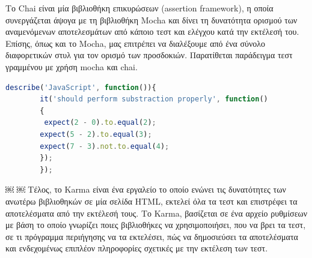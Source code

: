 		Το Chai είναι μία βιβλιοθήκη επικυρώσεων (assertion framework), η οποία συνεργάζεται άψογα με τη βιβλιοθήκη Mocha και δίνει τη δυνατότητα ορισμού των αναμενόμενων αποτελεσμάτων από κάποιο τεστ και ελέγχου κατά την εκτέλεσή του. Επίσης, όπως και το Mocha, μας επιτρέπει να διαλέξουμε από ένα σύνολο διαφορετικών στυλ για τον ορισμό των προσδοκιών. Παρατίθεται παράδειγμα τεστ γραμμένου με χρήση mocha και chai.
		
		   	\begin{lstlisting}[language=JavaScript]		
		describe('JavaScript', function()){
		it('should perform substraction properly', function() 
		{
	     expect(2 - 0).to.equal(2);
		expect(5 - 2).to.equal(3); 
		expect(7 - 3).not.to.equal(4);
		}); 
		});
				\end{lstlisting}
				
￼
￼
		Τέλος, το Karma είναι ένα εργαλείο το οποίο ενώνει τις δυνατότητες των ανωτέρω βιβλιοθηκών σε μία σελίδα HTML, εκτελεί όλα τα τεστ και επιστρέφει τα αποτελέσματα από την εκτέλεσή τους. Το Karma, βασίζεται σε ένα αρχείο ρυθμίσεων με βάση το οποίο γνωρίζει ποιες βιβλιοθήκες να χρησιμοποιήσει, που να βρει τα τεστ, σε τι πρόγραμμα περιήγησης να τα εκτελέσει, πώς να δημοσιεύσει τα αποτελέσματα και ενδεχομένως επιπλέον πληροφορίες σχετικές με την εκτέλεση των τεστ. 


